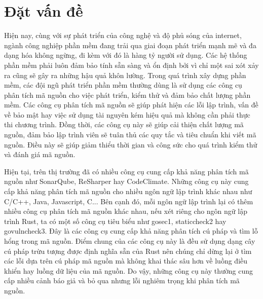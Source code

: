 \chapter{Đặt vấn đề}
\label{chap:introduction}

Hiện nay, cùng với sự phát triển của công nghệ và độ phủ sóng của internet, ngành công nghiệp phần mềm đang trải qua giai đoạn phát triển mạnh mẽ và đa dạng hóa không ngừng, đi kèm với đó là hàng tỷ người sử dụng.
Các hệ thống phần mềm phải luôn đảm bảo tính sẵn sàng và ổn định bởi vì chỉ một sai xót xảy ra cũng sẽ gây ra những hậu quả khôn lường.
Trong quá trình xây dựng phần mềm, các đội ngũ phát triển phần mềm thường dùng là sử dụng các công cụ phân tích mã nguồn cho việc phát triển, kiểm thử và đảm bảo chất lượng phần mềm.
Các công cụ phân tích mã nguồn sẽ giúp phát hiện các lỗi lập trình, vấn đề về bảo mật hay việc sử dụng tài nguyên kém hiệu quả mà không cần phải thực thi chương trình.
Đồng thời, các công cụ này sẽ giúp cải thiện chất lượng mã nguồn, đảm bảo lập trình viên sẽ tuân thủ các quy tắc và tiêu chuẩn khi viết mã nguồn.
Điều này sẽ giúp giảm thiểu thời gian và công sức cho quá trình kiểm thử và đánh giá mã nguồn.

Hiện tại, trên thị trường đã có nhiều công cụ cung cấp khả năng phân tích mã nguồn như SonarQube, ReSharper hay CodeClimate.
Những công cụ này cung cấp khả năng phân tích mã nguồn cho nhiều ngôn ngữ lập trình khác nhau như C/C++, Java, Javascript, C...
Bên cạnh đó, mỗi ngôn ngữ lập trình lại có thêm nhiều công cụ phân tích mã nguồn khác nhau, nếu xét riêng cho ngôn ngữ lập trình Rust, ta có một số công cụ tiêu biểu như gosec1, staticcheck2 hay govulncheck3.
Đây là các công cụ cung cấp khả năng phân tích cú pháp và tìm lỗ hổng trong mã nguồn.
Điểm chung của các công cụ này là đều sử dụng dạng cây cú pháp trừu tượng được định nghĩa sẵn của Rust nên chúng chỉ dừng lại ở tìm các lỗi dựa trên cú pháp mã nguồn mà không khai thác sâu hơn về luồng điều khiển hay luồng dữ liệu của mã nguồn.
Do vậy, những công cụ này thường cung cấp nhiều cảnh báo giả và bỏ qua nhưng lỗi nghiêm trọng khi phân tích mã nguồn.

